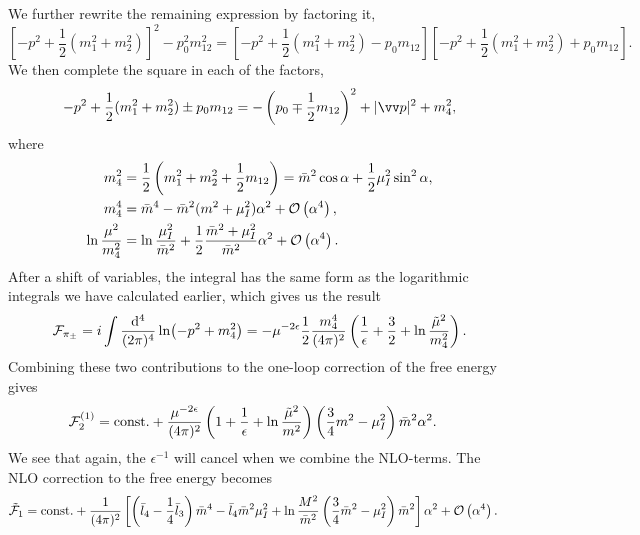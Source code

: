 We further rewrite the remaining expression by factoring it,
\begin{equation}
    \left[-p^2 + \frac{1}{2}(m_1^2 + m_2^2)\right]^2 - p_0^2 m_{12}^2
    = \left[-p^2 + \frac{1}{2}(m_1^2 + m_2^2) - p_0 m_{12} \right]
    \left[-p^2 + \frac{1}{2}(m_1^2 + m_2^2) + p_0 m_{12} \right].
\end{equation}
We then complete the square in each of the factors,
\begin{equation}
    - p^2 + \frac{1}{2}(m_1^2 + m_2^2) \pm p_0 m_{12}
    = - \left(p_0 \mp \frac{1}{2}m_{12}\right)^2 + |\vv p|^2 + m_4^2,
\end{equation}
where
\begin{align}
    m_4^2 &= \frac{1}{2}\left(m_1^2 +m_2^2 +\frac{1}{2}m_{12}\right)
    = \bar m^2 \cos\alpha + \frac{1}{2} \mu_I^2 \sin^2 \alpha, \\
    m_4^4
    &= \bar m^4 - \bar m^2(m^2 + \mu_I^2) \alpha^2 + \Oh[4]{\alpha}, \\
    \ln \frac{\mu^2}{m_4^2} 
    &= \ln \frac{\mu_I^2}{\bar m^2} + \frac{1}{2}\frac{\bar m^2 + \mu_I^2}{\bar m^2}\alpha^2
    + \Oh[4]{\alpha}.
\end{align}
After a shift of variables, the integral has the same form as the logarithmic integrals we have calculated earlier, which gives us the result
\begin{equation}
    \Ef_{\pi_\pm}
    = i \int \frac{\dd^4}{(2\pi)^4}
    \ln(-p^2 + m_4^2)
    = 
    - \mu^{-2\epsilon}\frac{1}{2} \frac{m_4^4}{(4 \pi)^2}
    \left(\frac{1}{\epsilon} + \frac{3}{2} + \ln \frac{\tilde \mu^2}{m_4^2}\right).
\end{equation}
Combining these two contributions to the one-loop correction of the free energy gives
\begin{align*}
    \Ef_2^{(1)}
    &=
    \mathrm{const.}
    +
    \frac{\mu^{-2 \epsilon } }{(4 \pi)^2} 
    \left(1 + \frac{1}{\epsilon} + \ln \frac{\tilde \mu^2}{m^2}\right)
    \left(\frac{3}{4}m^2 - \mu_I^2\right)
    \bar m^2 \alpha^2.
\end{align*}
We see that again, the $\epsilon^{-1}$ will cancel when we combine the NLO-terms.
The NLO correction to the free energy becomes
\begin{align}
    \tilde \Ef_1
    & = 
    \const+ 
    \frac{1}{(4\pi)^2}
    \left[
        \left(
            \bar l_4 - \frac{1}{4}\bar l_3
        \right)\bar m^4
        -\bar l_4\bar m^2\mu_I^2
        + \ln\frac{M^2}{\bar m^2}
        \left(\frac{3}{4}\bar m^2 - \mu_I^2\right)\bar m^2
    \right]\alpha^2
    + \Oh[4]{\alpha}.
\end{align}
